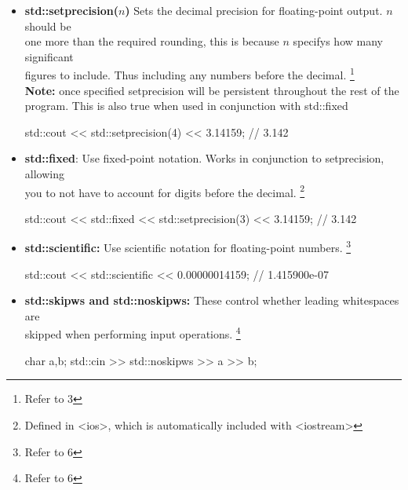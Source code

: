 \documentclass{report}
\begin{document}
\begin{itemize}
        \item \textbf{std::setprecision($n$)} Sets the decimal precision for floating-point output. $n$ should be  \\ one more than the required rounding, this is because $n$ specifys how many significant  \\ figures to include. Thus including any numbers before the decimal. \footnote{Refer to 3} \\
            \textbf{Note:} once specified setprecision will be persistent throughout the rest of the program. This is also true when used in conjunction with std::fixed

            \smallbreak
            
            \begin{cppcode}
            std::cout << std::setprecision(4) << 3.14159; // 3.142
            \end{cppcode}
            
            \pagebreak
        \item \textbf{std::fixed}: Use fixed-point notation. Works in conjunction to setprecision, allowing \\ you to not have to account for digits before the decimal.  \footnote{Defined in <ios>, which is automatically included with <iostream>}
            \smallbreak
            
            \begin{cppcode}
            std::cout << std::fixed << std::setprecision(3) << 3.14159; 
            // 3.142
            \end{cppcode}
            
        \item \textbf{std::scientific:} Use scientific notation for floating-point numbers. \footnote{Refer to 6}
            \smallbreak
            
            \begin{cppcode}
            std::cout << std::scientific << 0.00000014159; 
            // 1.415900e-07 
            \end{cppcode}
            
        \item \textbf{std::skipws and std::noskipws:} These control whether leading whitespaces are \\ skipped when performing input operations. \footnote{Refer to 6}
            \smallbreak
            
            \begin{cppcode}
            char a,b;
            std::cin >> std::noskipws >> a >> b;
            \end{cppcode}
            

\end{itemize}
\end{document}
